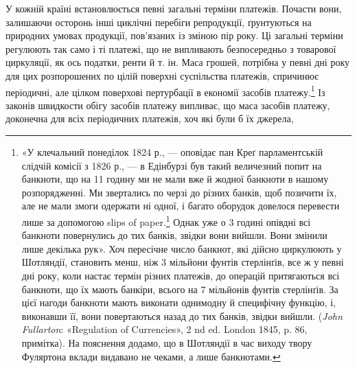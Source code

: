 У кожній країні встановлюється певні загальні терміни платежів.
Почасти вони, залишаючи осторонь інші циклічні перебіги
репродукції, ґрунтуються на природних умовах продукції,
пов’язаних із зміною пір року. Ці загальні терміни регулюють
так само і ті платежі, що не випливають безпосередньо з товарової
циркуляції, як ось податки, ренти й т. ін. Маса грошей, потрібна
у певні дні року для цих розпорошених по цілій поверхні суспільства
платежів, спричинює періодичні, але цілком поверхові пертурбації
в економії засобів платежу.\footnote{
«У клечальний понеділок 1824 р., — оповідає пан Креґ парламентській
слідчій комісії з 1826 р., — в Едінбурзі був такий величезний попит
на банкноти, що на 11 годину ми не мали вже й жодної банкноти в нашому
розпорядженні. Ми звертались по черзі до різних банків, щоб позичити
їх, але не мали змоги одержати ні одної, і багато оборудок довелося перевести
лише за допомогою slips of paper.\footnote*{
— шматків паперу. \emph{Ред.}
} Однак уже о 3 годині опівдні
всі банкноти повернулись до тих банків, звідки вони вийшли. Вони змінили
лише декілька рук». Хоч пересічне число банкнот, які дійсно циркулюють
у Шотляндії, становить менш, ніж 3 мільйони фунтів стерлінґів,
все ж у певні дні року, коли настає термін різних платежів, до операцій
притягаються всі банкноти, що їх мають банкіри, всього на 7 мільйонів
фунтів стерлінґів. За цієї нагоди банкноти мають виконати однимодну
й специфічну функцію, і, виконавши її, вони повертаються назад
до тих банків, звідки вийшли. (\emph{John Fullarton}: «Regulation of Currencies»,
2 nd ed. London 1845, p. 86, примітка). На пояснення додамо, що в Шотляндії
в час виходу твору Фуляртона вклади видавано не чеками, а лише
банкнотами.
} Із законів швидкости
обігу засобів платежу випливає, що маса засобів платежу, доконечна
для всіх періодичних платежів, хоч які були б їх джерела,
